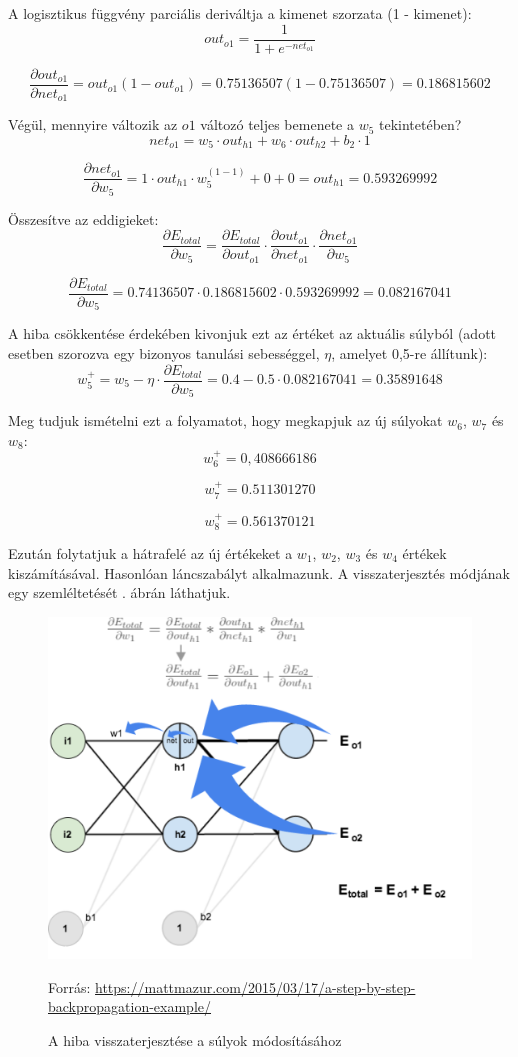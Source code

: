 A logisztikus függvény parciális deriváltja a kimenet szorzata (1 - kimenet):
$$
out_{o1} = \frac{1}{1+e^{-net_{o1}}}
$$

$$
\frac{\partial out_{o1}}{\partial net_{o1}} = out_{o1}(1 - out_{o1}) = 0.75136507(1 - 0.75136507) = 0.186815602
$$

Végül, mennyire változik az $o1$ változó teljes bemenete a $w_5$ tekintetében?
$$
net_{o1} = w_5 \cdot out_{h1} + w_6 \cdot out_{h2} + b_2 \cdot 1
$$

$$
\frac{\partial net_{o1}}{\partial w_{5}} = 1 \cdot out_{h1} \cdot w_5^{(1 - 1)} + 0 + 0 = out_{h1} = 0.593269992
$$

Összesítve az eddigieket:
$$
\frac{\partial E_{total}}{\partial w_{5}} = \frac{\partial E_{total}}{\partial out_{o1}} \cdot \frac{\partial out_{o1}}{\partial net_{o1}} \cdot \frac{\partial net_{o1}}{\partial w_{5}}
$$

$$
\frac{\partial E_{total}}{\partial w_{5}} = 0.74136507 \cdot 0.186815602 \cdot 0.593269992 = 0.082167041
$$

A hiba csökkentése érdekében kivonjuk ezt az értéket az aktuális súlyból (adott esetben szorozva egy bizonyos tanulási sebességgel, $\eta$, amelyet 0,5-re állítunk):
$$
w_5^{+} = w_5 - \eta \cdot \frac{\partial E_{total}}{\partial w_{5}} = 0.4 - 0.5 \cdot 0.082167041 = 0.35891648
$$

Meg tudjuk ismételni ezt a folyamatot, hogy megkapjuk az új súlyokat $w_6$, $w_7$ és $w_8$:
$$
w_6 ^ {+} = 0,408666186
$$

$$
w_7 ^ {+} = 0.511301270
$$

$$
w_8 ^ {+} = 0.561370121
$$

Ezután folytatjuk a hátrafelé az új értékeket a $w_1$, $w_2$, $w_3$ és $w_4$ értékek kiszámításával. Hasonlóan láncszabályt alkalmazunk. A visszaterjesztés módjának egy szemléltetését . ábrán láthatjuk.

\begin{figure}[h]
\centering
\includegraphics[scale=0.5]{images/ANN_bp_viz}
\caption{A hiba visszaterjesztése a súlyok módosításához}
\label{fig:ANN_bp_viz}
Forrás: \url{https://mattmazur.com/2015/03/17/a-step-by-step-backpropagation-example/}
\end{figure}

